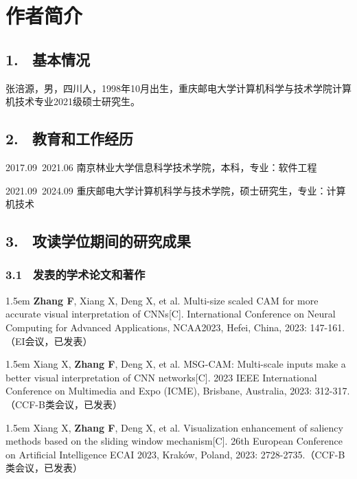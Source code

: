 \specialsectioning


\chapter{作者简介}
\thispagestyle{others}
\pagestyle{others}
\xiaosi

\section{1. \ 基本情况}
张涪源，男，四川人，1998年10月出生，重庆邮电大学计算机科学与技术学院计算机技术专业2021级硕士研究生。

\section{2. \ 教育和工作经历}



2017.09~2021.06 南京林业大学信息科学技术学院，本科，专业：软件工程

2021.09~2024.09 重庆邮电大学计算机科学与技术学院，硕士研究生，专业：计算机技术

\section{3. \ 攻读学位期间的研究成果}

\subsection{3.1 \ 发表的学术论文和著作}
\hangindent 1.5em
\noindent
[1] \textbf{Zhang F}, Xiang X, Deng X, et al. Multi-size scaled CAM for more accurate visual interpretation of CNNs[C]. International Conference on Neural Computing for Advanced Applications, NCAA2023, Hefei, China, 2023: 147-161.（EI会议，已发表）

\hangindent 1.5em
\noindent
[2] Xiang X, \textbf{Zhang F}, Deng X, et al. MSG-CAM: Multi-scale inputs make a better visual interpretation of CNN networks[C]. 2023 IEEE International Conference on Multimedia and Expo (ICME), Brisbane, Australia, 2023: 312-317.（CCF-B类会议，已发表）

\hangindent 1.5em
\noindent
[3] Xiang X, \textbf{Zhang F}, Deng X, et al. Visualization enhancement of saliency methods based on the sliding window mechanism[C]. 26th European Conference on Artificial Intelligence ECAI 2023, Kraków, Poland, 2023: 2728-2735.（CCF-B类会议，已发表）

